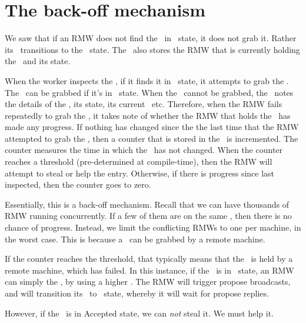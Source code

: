 \section{The back-off mechanism} \label{sec:backoff}
We saw that if an RMW does not find the \kv~in \invalid~state, it does not grab it. Rather its \locentry~transitions to the \need~state. The \locentry~also stores the RMW that is currently holding the \kv~and its state. 

When the worker inspects the \locentry, if it finds it in \need~state, it attempts to grab the \kv. The \kv~can be grabbed if it's in \invalid~state. 
When the \kv~cannot be grabbed, the \locentry~notes the details of the \kv, its state, its current \propts~etc. Therefore, when the RMW fails repeatedly to grab the \kv, it takes note of whether the RMW that holds the \kv~has made any progress.
If nothing has changed since the the last time that the RMW attempted to grab the \kv, then a counter that is stored in the \locentry~is incremented. The counter measures the time in which the \kv~has not changed. When the counter reaches a threshold (pre-determined \eg at compile-time), then the RMW will attempt to steal or help the entry.
Otherwise, if there is progress since last inspected, then the counter goes to zero.

Essentially, this is a back-off mechanism. Recall that we can have thousands of RMW running concurrently. If a few of them are on the same \kv, then there is no chance of progress.
Instead, we limit the conflicting RMWs to one per machine, in the worst case. This is because a \kv~can be grabbed by a remote machine.

\custvspace

If the counter reaches the threshold, that typically means that the \kv~is held by a remote machine, which has failed. In this instance, if the \kv~is in \proped~state, an RMW can simply  the \kv, by using a higher \propts. The RMW will trigger propose broadcasts, and will transition its \locentry~to \proped~state, whereby it will wait for propose replies.

However, if the \kv~is in Accepted state, we can \emph{not} steal it. We must help it.